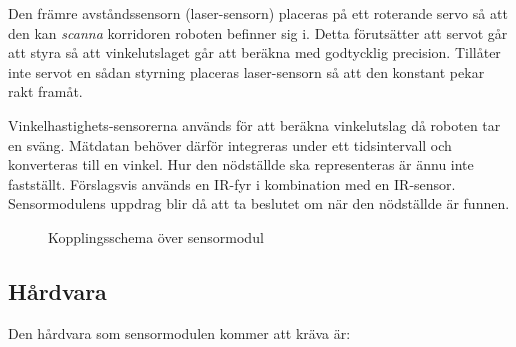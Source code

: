 \documentclass[11pt]{article}
\begin{document}
\begin{flushleft}
Den främre avståndssensorn (laser-sensorn) placeras på ett roterande servo så att den kan \emph{scanna} korridoren roboten befinner sig i. Detta förutsätter att servot går att styra så att vinkelutslaget går att beräkna med godtycklig precision. Tillåter inte servot en sådan styrning placeras laser-sensorn så att den konstant pekar rakt framåt.

Vinkelhastighets-sensorerna används för att beräkna vinkelutslag då roboten tar en sväng. Mätdatan behöver därför integreras under ett tidsintervall och konverteras till en vinkel. Hur den nödställde ska representeras är ännu inte fastställt. Förslagsvis används en IR-fyr i kombination med en IR-sensor. Sensormodulens uppdrag blir då att ta beslutet om när den nödställde är funnen.

\begin{figure}[htbp]
\centering
\noindent{}
	\caption{Kopplingsschema över sensormodul \label{kopplingsschema:sensormodul}}	
\end{figure}
 
\subsection{Hårdvara}
Den hårdvara som sensormodulen kommer att kräva är:


\end{flushleft}
\end{document}
